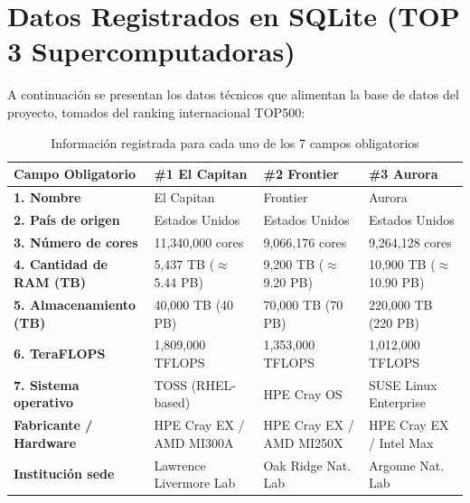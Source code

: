 \documentclass[11pt,a4paper]{article}
\begin{document}
\newpage

\section{Datos Registrados en SQLite (TOP 3 Supercomputadoras)}

A continuación se presentan los datos técnicos que alimentan la base de datos del proyecto, tomados del ranking internacional TOP500:

\begin{table}[H]
    \centering
    \caption{Información registrada para cada uno de los 7 campos obligatorios}
    \label{tab:datos_superc}
    \small
    \begin{tabularx}{\textwidth}{l p{3.4cm} p{3.4cm} p{3.4cm}}
        \toprule
        \textbf{Campo Obligatorio} & \textbf{\#1 El Capitan} & \textbf{\#2 Frontier} & \textbf{\#3 Aurora} \\
        \midrule
        \textbf{1. Nombre} & El Capitan & Frontier & Aurora \\
        \textbf{2. País de origen} & Estados Unidos & Estados Unidos & Estados Unidos \\
        \textbf{3. Número de cores} & 11,340,000 cores & 9,066,176 cores & 9,264,128 cores \\
        \textbf{4. Cantidad de RAM (TB)} & 5,437 TB ($\approx$ 5.44 PB) & 9,200 TB ($\approx$ 9.20 PB) & 10,900 TB ($\approx$ 10.90 PB) \\
        \textbf{5. Almacenamiento (TB)} & 40,000 TB (40 PB) & 70,000 TB (70 PB) & 220,000 TB (220 PB) \\
        \textbf{6. TeraFLOPS} & 1,809,000 TFLOPS & 1,353,000 TFLOPS & 1,012,000 TFLOPS \\
        \textbf{7. Sistema operativo} & TOSS (RHEL-based) & HPE Cray OS & SUSE Linux Enterprise \\
        \midrule
        \textbf{Fabricante / Hardware} & HPE Cray EX / AMD MI300A & HPE Cray EX / AMD MI250X & HPE Cray EX / Intel Max \\
        \textbf{Institución sede} & Lawrence Livermore Lab & Oak Ridge Nat. Lab & Argonne Nat. Lab \\
        \bottomrule
    \end{tabularx}
\end{table}
\end{document}
